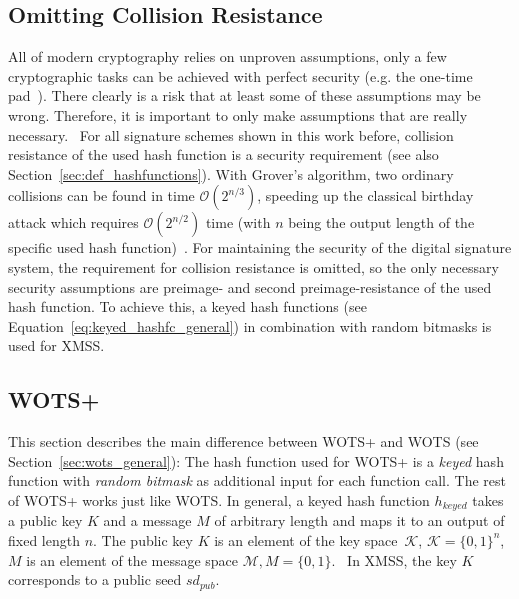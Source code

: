 \subsection{Omitting Collision Resistance}
All of modern cryptography relies on unproven assumptions, only a few cryptographic tasks can be achieved with perfect security (e.g. the one-time pad~\cite{one_time_pad_2013}). There clearly is a risk that at least some of these assumptions may be wrong. Therefore, it is important to only make assumptions that are really necessary.~\cite{minimal_security_assump_phd_2016}
For all signature schemes shown in this work before, collision resistance of the used hash function is a security requirement (see also Section~\ref{sec:def_hashfunctions}). 
With Grover’s algorithm, two ordinary collisions can be found in time $\mathcal{O}(2^{n/3})$, speeding up the classical birthday attack which requires $\mathcal{O}(2^{n/2})$ time (with $n$ being the output length of the specific used hash function)~\cite{colission_complexity_reduction_quantum_2019, birthday_attack_quantum_collision_1998}. %
For maintaining the security of the digital signature system, the requirement for collision resistance is omitted, so the only necessary security assumptions are preimage- and second preimage-resistance of the used hash function.
To achieve this, a keyed hash functions (see Equation~\ref{eq:keyed_hashfc_general}) in combination with random bitmasks is used for XMSS. %


\subsection{WOTS+}
\label{sec:wots+_general}
This section describes the main difference between WOTS+ and WOTS (see Section~\ref{sec:wots_general}): The hash function used for WOTS+ is a \textit{keyed} hash function with \textit{random bitmask} as additional input for each function call. The rest of WOTS+ works just like WOTS.
In general, a keyed hash function $h_{keyed}$ takes a public key $K$ and a message $M$ of arbitrary length and maps it to an output of fixed length $n$. The public key $K$ is an element of the key space~$\mathcal{K}$, $\mathcal{K}=\{0,1\}^n$, $M$ is an element of the message space $\mathcal{M}, M=\{0,1\}$.~\cite{keyed_hashfct_introduct_2006} In XMSS, the key $K$ corresponds to a public seed $sd_{pub}$. 

